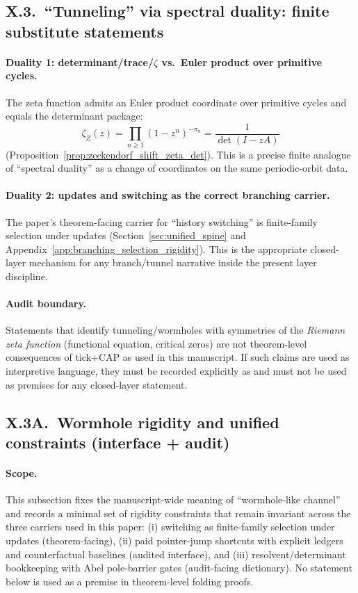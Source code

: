 \subsection{X.3.\ ``Tunneling'' via spectral duality: finite substitute statements}
\label{subsec:x3_tunneling_spectral_duality_finite}

\paragraph{Duality 1: determinant/trace/\texorpdfstring{$\zeta$}{zeta} vs.\ Euler product over primitive cycles.}
\MathTag The zeta function admits an Euler product coordinate over primitive cycles and equals the determinant package:
\[
\zeta_Z(z)=\prod_{n\ge 1}(1-z^n)^{-\pi_n}=\frac{1}{\det(I-zA)}
\]
(Proposition~\ref{prop:zeckendorf_shift_zeta_det}).
This is a precise finite analogue of ``spectral duality'' as a change of coordinates on the same periodic-orbit data.

\paragraph{Duality 2: updates and switching as the correct branching carrier.}
\MathTag The paper's theorem-facing carrier for ``history switching'' is finite-family selection under updates (Section~\ref{sec:unified_spine} and Appendix~\ref{app:branching_selection_rigidity}).
This is the appropriate closed-layer mechanism for any branch/tunnel narrative inside the present layer discipline.

\paragraph{Audit boundary.}
\AuditTag Statements that identify tunneling/wormholes with symmetries of the \emph{Riemann zeta function} (functional equation, critical zeros) are not theorem-level consequences of tick+CAP as used in this manuscript.
If such claims are used as interpretive language, they must be recorded explicitly as \AuditTag and must not be used as premises for any closed-layer statement.

\subsection{X.3A.\ Wormhole rigidity and unified constraints (interface + audit)}
\label{subsec:x3a_wormhole_rigidity_unified_constraints}

\paragraph{Scope.}
\InterfaceTag This subsection fixes the manuscript-wide meaning of ``wormhole-like channel'' and records a minimal set of rigidity constraints that remain invariant across the three carriers used in this paper:
(i) switching as finite-family selection under updates (theorem-facing),
(ii) paid pointer-jump shortcuts with explicit ledgers and counterfactual baselines (audited interface),
and (iii) resolvent/determinant bookkeeping with Abel pole-barrier gates (audit-facing dictionary).
No statement below is used as a premise in theorem-level folding proofs.

